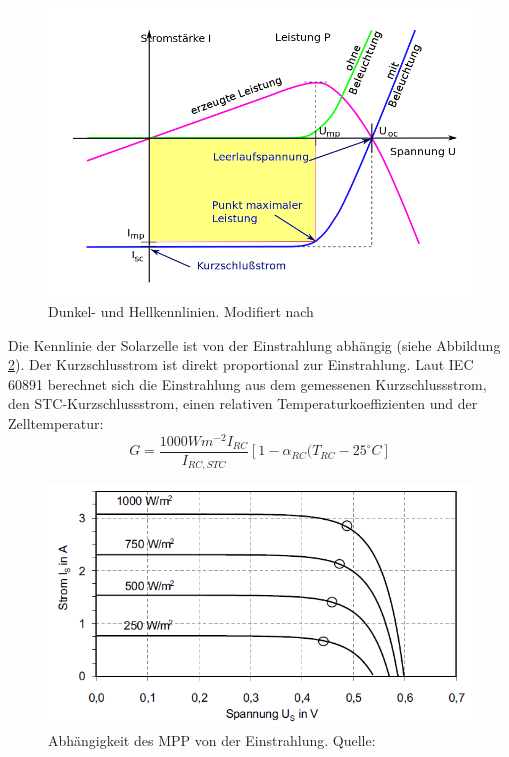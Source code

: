 \documentclass[a4paper,bibtotoc,oneside]{scrbook}
\begin{document}
\begin{figure}[htbp]
\centering
\includegraphics[width=125mm]{img/kennlinie.png}
\caption{Dunkel- und Hellkennlinien. Modifiert nach \cite{kl}}\label{kennlinie}
\end{figure}

Die Kennlinie der Solarzelle ist von der Einstrahlung abhängig (siehe Abbildung \ref{mpp}). Der Kurzschlusstrom ist direkt proportional zur Einstrahlung.
Laut IEC 60891 \cite{norm891} berechnet sich die Einstrahlung aus dem gemessenen Kurzschlussstrom, den STC-Kurzschlussstrom, einen relativen Temperaturkoeffizienten und der Zelltemperatur:
\begin{equation}
G = \frac{1000Wm^{-2}I_{RC}}{I_{RC,STC}} [1 - \alpha_{RC}(T_{RC}-25^{\circ} C]
\end{equation}
\begin{figure}[htbp]
\centering
\includegraphics[width=125mm]{img/kennlinien.png}
\caption{Abhängigkeit des MPP von der Einstrahlung. Quelle: \cite{pv}}\label{mpp}
\end{figure}
\end{document}
